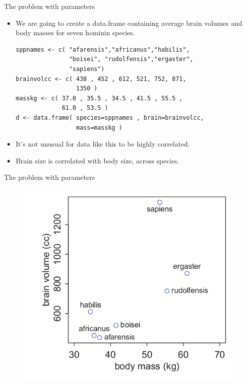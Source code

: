\documentclass[handout]{beamer}
\begin{document}
\begin{frame}[fragile]{The problem with parameters}
\scriptsize{

\begin{itemize}

\item We are going to create a data.frame containing  average brain volumes and body masses for seven hominin species.

\begin{verbatim}
sppnames <- c( "afarensis","africanus","habilis",
               "boisei", "rudolfensis","ergaster",
               "sapiens")
brainvolcc <- c( 438 , 452 , 612, 521, 752, 871, 
                 1350 )
masskg <- c( 37.0 , 35.5 , 34.5 , 41.5 , 55.5 , 
             61.0 , 53.5 )
d <- data.frame( species=sppnames , brain=brainvolcc,
                 mass=masskg ) 
\end{verbatim}

\item It's not unusual for data like this to be highly correlated.
\item Brain size is correlated with body size, across
species. 

\end{itemize}


} 
\end{frame}


\begin{frame}[fragile]{The problem with parameters}
\scriptsize{

\begin{figure}[h!]
	\centering
	\includegraphics[scale=0.41]{pics/hominin.png}
\end{figure}


} 
\end{frame}
\end{document}
